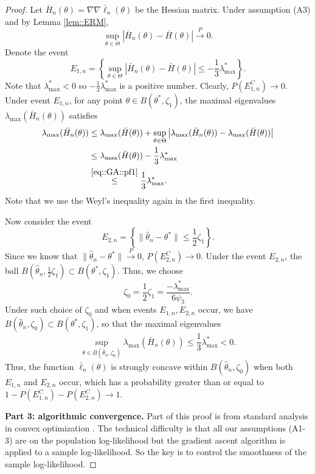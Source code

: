 \documentclass[aos, preprint]{imsart}
\theoremstyle{plain}
\theoremstyle{definition}
\let\hat\widehat
\begin{document}
\begin{appendix}
\begin{proof}
Let $\bar H_n(\theta)  = \nabla\nabla \bar \ell_n(\theta)$ be the Hessian matrix. 
Under assumption (A3) and by Lemma \ref{lem::ERM},
$$
\sup_{\theta\in\Theta} \left|\bar H_n(\theta) - \bar H(\theta)\right|\overset{P}{\rightarrow}0.
$$
Denote the event 
$$
E_{1,n} = \left\{\sup_{\theta\in\Theta} \left|\bar H_n(\theta) - \bar H(\theta)\right|\leq -\frac{1}{3}\lambda^*_{\max}\right\}.
$$
Note that $\lambda^*_{\max}<0$ so $-\frac{1}{3}\lambda^*_{\max}$ is a positive number.
Clearly, $P(E^C_{1,n})\rightarrow 0$. 
Under event $E_{1,n}$, for any point $\theta \in B(\theta^*, \zeta_1)$, 
the maximal eigenvalues $\lambda_{\max}(\bar H_n(\theta))$
satisfies
\begin{align*}
\lambda_{\max}(\bar H_n(\theta)) &\leq  \lambda_{\max}(\bar H(\theta)) + \sup_{\theta\in\Theta}\left|\lambda_{\max}(\bar H_n(\theta))-\lambda_{\max}(\bar H(\theta))\right|\\
&\leq  \lambda_{\max}(\bar H(\theta)) - \frac{1}{3}\lambda^*_{\max}\\
& \overset{\eqref{eq::GA::pf1}}{\leq} \frac{1}{3}\lambda^*_{\max}.
\end{align*}
Note that we use the Weyl's inequality again in the first inequality.

Now consider the event 
$$
E_{2,n} = \left\{\|\hat \theta_n - \theta^*\|\leq \frac{1}{2}\zeta_1 \right\}. 
$$
Since we know that $\|\hat \theta_n - \theta^*\|\overset{P}{\rightarrow}0$, 
$P(E^C_{2,n})\rightarrow 0$. 
Under the event $E_{2,n}$, the ball $B\left(\hat\theta_n, \frac{1}{2}\zeta_1\right)\subset B(\theta^*, \zeta_1)$.
Thus, we choose 
$$
\zeta_0 = \frac{1}{2}\zeta_1 =\frac{-\lambda^*_{\max}}{6 \psi_3}.
$$
Under such choice of $\zeta_0$ and when events $E_{1,n},E_{2,n}$ occur, we have $B\left(\hat\theta_n,\zeta_0\right)\subset B(\theta^*, \zeta_1)$,
so that the maximal eigenvalues 
$$
\sup_{\theta \in B\left(\hat\theta_n,\zeta_0\right)} \lambda_{\max}(\bar H_n(\theta)) \leq \frac{1}{3}\lambda^*_{\max} < 0.
$$
Thus, the function $\bar \ell_n(\theta)$ is strongly concave within $B\left(\hat\theta_n,\zeta_0\right)$
when both $E_{1,n} $ and $E_{2,n}$ occur, which 
has a probability greater than or equal to $1-P(E^C_{1,n}) - P(E^C_{2,n})\rightarrow 1$.


{\bf Part 3: algorithmic convergence.}
Part of this proof is
from standard analysis in convex optimization \citep{boyd2004convex}. 
The technical difficulty is that all our assumptions (A1-3)
are on the population log-likelihood but the gradient ascent algorithm is applied to a
sample log-likelihood.
So the key is to control the smoothness of the sample log-likelihood.


\end{proof}
\end{appendix}
\end{document}
